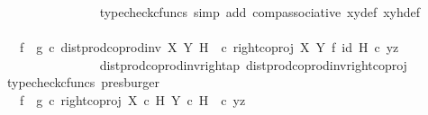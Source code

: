 \begin{isabellebody}
\ \ \ \ \ \ \ \ \ \ \ \ \ \ \isamarkupfalse%
\ {\isacharparenleft}{\kern0pt}typecheck{\isacharunderscore}{\kern0pt}cfuncs{\isacharcomma}{\kern0pt}\ simp\ add{\isacharcolon}{\kern0pt}\ comp{\isacharunderscore}{\kern0pt}associative{}\ xy{\isacharunderscore}{\kern0pt}def\ xyh{\isacharunderscore}{\kern0pt}def{\isacharparenright}{\kern0pt}\isanewline
\ \ \ \ \ \ \ \ \ \ \ \ \isamarkupfalse%
\ \isamarkupfalse%
\ {\isachardoublequoteopen}{\isachardot}{\kern0pt}{\isachardot}{\kern0pt}{\isachardot}{\kern0pt}\ {\isacharequal}{\kern0pt}\ {\isacharparenleft}{\kern0pt}f\isactrlsup {\isasymflat}\ {\isasymamalg}\ g\isactrlsup {\isasymflat}{\isacharparenright}{\kern0pt}\ {\isasymcirc}\isactrlsub c\ {\isacharparenleft}{\kern0pt}{\isacharparenleft}{\kern0pt}dist{\isacharunderscore}{\kern0pt}prod{\isacharunderscore}{\kern0pt}coprod{\isacharunderscore}{\kern0pt}inv{}\ X\ Y\ H\ \ {\isasymcirc}\isactrlsub c\ {\isacharparenleft}{\kern0pt}right{\isacharunderscore}{\kern0pt}coproj\ X\ Y\ {\isasymtimes}\isactrlsub f\ id\ H{\isacharparenright}{\kern0pt}{\isacharparenright}{\kern0pt}\ {\isasymcirc}\isactrlsub c\ {\isasymlangle}y{\isacharcomma}{\kern0pt}z{\isasymrangle}{\isacharparenright}{\kern0pt}{\isachardoublequoteclose}\isanewline
\ \ \ \ \ \ \ \ \ \ \ \ \ \ \isamarkupfalse%
\ dist{\isacharunderscore}{\kern0pt}prod{\isacharunderscore}{\kern0pt}coprod{\isacharunderscore}{\kern0pt}inv{}{\isacharunderscore}{\kern0pt}right{\isacharunderscore}{\kern0pt}ap\ dist{\isacharunderscore}{\kern0pt}prod{\isacharunderscore}{\kern0pt}coprod{\isacharunderscore}{\kern0pt}inv{}{\isacharunderscore}{\kern0pt}right{\isacharunderscore}{\kern0pt}coproj\ \isamarkupfalse%
\ {\isacharparenleft}{\kern0pt}typecheck{\isacharunderscore}{\kern0pt}cfuncs{\isacharcomma}{\kern0pt}\ presburger{\isacharparenright}{\kern0pt}\isanewline
\ \ \ \ \ \ \ \ \ \ \ \ \isamarkupfalse%
\ \isamarkupfalse%
\ {\isachardoublequoteopen}{\isachardot}{\kern0pt}{\isachardot}{\kern0pt}{\isachardot}{\kern0pt}\ {\isacharequal}{\kern0pt}\ {\isacharparenleft}{\kern0pt}f\isactrlsup {\isasymflat}\ {\isasymamalg}\ g\isactrlsup {\isasymflat}{\isacharparenright}{\kern0pt}\ {\isasymcirc}\isactrlsub c\ {\isacharparenleft}{\kern0pt}right{\isacharunderscore}{\kern0pt}coproj\ {\isacharparenleft}{\kern0pt}X\ {\isasymtimes}\isactrlsub c\ H{\isacharparenright}{\kern0pt}\ {\isacharparenleft}{\kern0pt}Y\ {\isasymtimes}\isactrlsub c\ H{\isacharparenright}{\kern0pt}\ \ {\isasymcirc}\isactrlsub c\ {\isasymlangle}y{\isacharcomma}{\kern0pt}z{\isasymrangle}{\isacharparenright}{\kern0pt}{\isachardoublequoteclose}\isanewline

\end{isabellebody}
